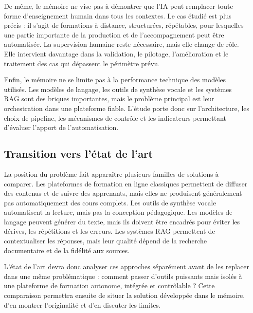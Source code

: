 De même, le mémoire ne vise pas à démontrer que l'IA peut remplacer toute forme
d'enseignement humain dans tous les contextes. Le cas étudié est plus précis : il s'agit de
formations à distance, structurées, répétables, pour lesquelles une partie importante de la
production et de l'accompagnement peut être automatisée. La supervision humaine reste
nécessaire, mais elle change de rôle. Elle intervient davantage dans la validation, le
pilotage, l'amélioration et le traitement des cas qui dépassent le périmètre prévu.

Enfin, le mémoire ne se limite pas à la performance technique des modèles utilisés. Les
modèles de langage, les outils de synthèse vocale et les systèmes RAG sont des briques
importantes, mais le problème principal est leur orchestration dans une plateforme fiable.
L'étude porte donc sur l'architecture, les choix de pipeline, les mécanismes de contrôle et
les indicateurs permettant d'évaluer l'apport de l'automatisation.

\subsection{Transition vers l'état de l'art}

La position du problème fait apparaître plusieurs familles de solutions à comparer. Les
plateformes de formation en ligne classiques permettent de diffuser des contenus et de
suivre des apprenants, mais elles ne produisent généralement pas automatiquement des
cours complets. Les outils de synthèse vocale automatisent la lecture, mais pas la
conception pédagogique. Les modèles de langage peuvent générer du texte, mais ils
doivent être encadrés pour éviter les dérives, les répétitions et les erreurs. Les systèmes
RAG permettent de contextualiser les réponses, mais leur qualité dépend de la recherche
documentaire et de la fidélité aux sources.

L'état de l'art devra donc analyser ces approches séparément avant de les replacer dans
une même problématique : comment passer d'outils puissants mais isolés à une
plateforme de formation autonome, intégrée et contrôlable ? Cette comparaison permettra
ensuite de situer la solution développée dans le mémoire, d'en montrer l'originalité et
d'en discuter les limites.
